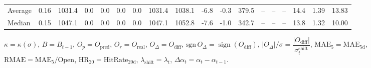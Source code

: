 \begin{threeparttable}
{\begin{tabular}{lrrrrrrrrrrrrrrrrr}
Average &     0.16 & 1031.4 &               0.0 &               0.0 &                0.0 &                0.0 & 1031.4 & 1038.1 &       -6.8 &                     -0.3 &               379.5 &         -- &        -- &             -- &             14.4 &            1.39 &                  13.83 \\
 Median &     0.15 & 1047.1 &               0.0 &               0.0 &                0.0 &                0.0 & 1047.1 & 1052.8 &       -7.6 &                     -1.0 &               342.7 &         -- &        -- &             -- &             13.8 &            1.32 &                  10.00 \\
\bottomrule
\end{tabular}
}
\begin{tablenotes}\footnotesize
\item $\kappa=\kappa(\sigma)$, $B=B_{t-1}$, $O_p=O_{\text{pred}}$, $O_r=O_{\text{real}}$, $O_\Delta=O_{\text{diff}}$, $\mathrm{sgn}\,O_\Delta=\operatorname{sign}(O_{\text{diff}})$, $|O_\Delta|/\sigma=\dfrac{|O_{\text{diff}}|}{\sigma_t^{\text{shift}}}$, $\mathrm{MAE}_5=\mathrm{MAE}_{5\text{d}}$, $\mathrm{RMAE}= \mathrm{MAE}_5 / \text{Open}$, $\mathrm{HR}_{20}=\mathrm{HitRate}_{20\text{d}}$, 
$\lambda_{\text{shift}}=\lambda_t$, 
$\Delta\alpha_t=\alpha_t-\alpha_{t-1}$.
\end{tablenotes}
\end{threeparttable}
\endgroup

